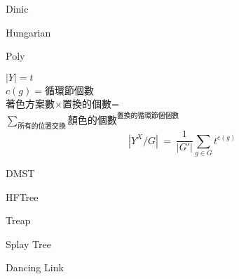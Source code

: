 \documentclass[12pt]{article}
\begin{document}
\begin{section}{Dinic}
  \begin{multicols}{2}
    
  \end{multicols}
\end{section}

\begin{section}{Hungarian}
  
\end{section}

\begin{section}{Poly}
  \begin{multicols}{2}
  $|Y|=t$\\
  $c(g)=$循環節個數\\
  著色方案數$\times$置換的個數=\\
  $\sum_{\text{所有的位置交換}}\text{顏色的個數}^{\text{置換的循環節個個數}}$
  \[
    |Y^X/G|\ =\ \frac{1}{|G'|}\sum_{g\in G}{t^{c(g)}}
  \]
  \end{multicols}
\end{section}

\begin{section}{DMST}
  
\end{section}

\begin{section}{HFTree}
  
\end{section}

\begin{section}{Treap}
  \begin{multicols}{2}
    
  \end{multicols}
\end{section}

\begin{section}{Splay Tree}
  \begin{multicols}{2}
    
  \end{multicols}
\end{section}

\begin{section}{Dancing Link}
  \begin{multicols}{2}
    
  \end{multicols}
\end{section}
\end{document}
